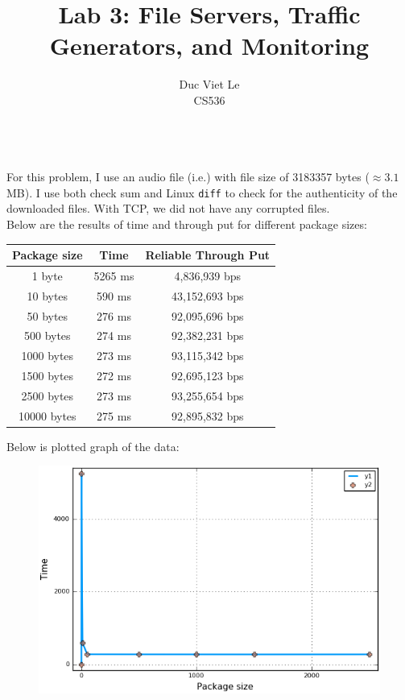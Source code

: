 \documentclass[12pt]{article}
\newenvironment{problem}[2][Problem]{\begin{trivlist}
\item[\hskip \labelsep {\bfseries #1}\hskip \labelsep {\bfseries #2.}]}{\end{trivlist}}
\begin{document}
 
\title{Lab 3: File Servers, Traffic Generators, and Monitoring}
\author{Duc Viet Le\\
 CS536}
 
\maketitle
 
\begin{problem}{1} \ \\
For this problem, I use an audio file (i.e.) with file size of 3183357 bytes ($\approx 3.1$ MB). I use both check sum and Linux \texttt{diff} to check for the authenticity of the downloaded files. With TCP, we did not have any corrupted files. 
\\
Below are the results of time and through put for different package sizes:
\begin{center}
	\begin{tabular}{|c|c|c|}
	\hline 
	Package size & Time & Reliable Through Put \\ \hline
	1 byte & 5265 ms & 4,836,939 bps \\ \hline
	10 bytes & 590 ms & 43,152,693 bps \\ \hline
	50 bytes & 276 ms & 92,095,696 bps \\ \hline
	500 bytes & 274 ms & 92,382,231 bps \\ \hline
	1000 bytes & 273 ms & 93,115,342 bps \\ \hline
	1500 bytes & 272 ms & 92,695,123 bps \\ \hline
	2500 bytes & 273 ms & 93,255,654 bps \\ \hline
	10000 bytes & 275 ms & 92,895,832 bps \\ \hline
	\end{tabular}
\end{center}
Below is plotted graph of the data: \\
\begin{figure}
\includegraphics[scale = .6]{1.png}

\end{figure}
\end{problem}
\end{document}
